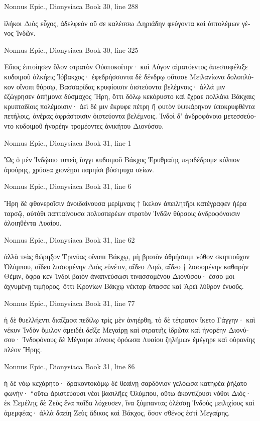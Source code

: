 \documentclass[12pt,letterpaper,twoside,final]{memoir}
\begin{document}
\begin{greek}
Nonnus Epic., Dionysiaca 
Book 30, line 288

ἱλήκοι Διὸς εὖχος, ἀδελφεὸν οὔ σε καλέσσω 
Δηριάδην φεύγοντα καὶ ἀπτολέμων γένος Ἰνδῶν. 



Nonnus Epic., Dionysiaca 
Book 30, line 325

Εὔιος ἐπτοίησεν ὅλον στρατὸν Οὐατοκοίτην· 
καὶ Λύγον αἱματόεντος ἀπεστυφέλιξε κυδοιμοῦ 
ἀλκήεις Ἰόβακχος· ἐφεδρήσσοντα δὲ δένδρῳ 
οὔτασε Μειλανίωνα δολοπλόκον οἴνοπι θύρσῳ, 
Βασσαρίδας κρυφίοισιν ὀιστεύοντα βελέμνοις· 
ἀλλά μιν ἐζώγρησεν ἀπήμονα δύσμαχος Ἥρη, 
ὅττι δόλῳ κεκόρυστο καὶ ἔχραε πολλάκι Βάκχαις 
κρυπταδίοις πολέμοισιν· ἀεὶ δέ μιν ἔκρυφε πέτρη 
ἢ φυτὸν ὑψικάρηνον ὑποκρυφθέντα πετήλοις, 
ἀνέρας ἀφράστοισιν ὀιστεύοντα βελέμνοις. 
 Ἰνδοὶ δ' ἀνδροφόνοιο μετεσσεύοντο κυδοιμοῦ 
ἠνορέην τρομέοντες ἀνικήτου Διονύσου. 



Nonnus Epic., Dionysiaca 
Book 31, line 1

Ὣς ὁ μὲν Ἰνδῴοιο τυπεὶς ἴυγγι κυδοιμοῦ 
Βάκχος Ἐρυθραίης περιδέδρομε κόλπον ἀρούρης, 
χρύσεα χιονέῃσι παρηίσι βόστρυχα σείων. 



Nonnus Epic., Dionysiaca 
Book 31, line 6

Ἥρη δὲ φθονεροῖσιν ἀνοιδαίνουσα μερίμναις 
† ἴκελον ἀπειλητῆρι κατέγραφεν ἠέρα ταρσῷ, 
αὐτόθι παπταίνουσα πολυσπερέων στρατὸν Ἰνδῶν 
θύρσοις ἀνδροφόνοισιν ἀλοιηθέντα Λυαίου. 



Nonnus Epic., Dionysiaca 
Book 31, line 62

ἀλλὰ τεὰς θώρηξον Ἐρινύας οἴνοπι Βάκχῳ, 
μὴ βροτὸν ἀθρήσαιμι νόθον σκηπτοῦχον Ὀλύμπου, 
αἴδεο λισσομένην Διὸς εὐνέτιν, αἴδεο Δηώ, 
αἴδεο † λισσομένην καθαρὴν Θέμιν, ὄφρα κεν Ἰνδοὶ 
βαιὸν ἀναπνεύσωσι τινασσομένου Διονύσου· 
ἔσσο μοι ἀχνυμένῃ τιμήορος, ὅττι Κρονίων   
Βάκχῳ νέκταρ ὄπασσε καὶ Ἄρεϊ λύθρον ἐνυοῦς. 



Nonnus Epic., Dionysiaca 
Book 31, line 77

ἡ δὲ θυελλήεντι διαΐξασα πεδίλῳ 
τρὶς μὲν ἀνηέρθη, τὸ δὲ τέτρατον ἵκετο Γάγγην· 
καὶ νέκυν Ἰνδὸν ὅμιλον ἀμειδέι δεῖξε Μεγαίρῃ 
καὶ στρατιῆς ἱδρῶτα καὶ ἠνορέην Διονύσου· 
Ἰνδοφόνους δὲ Μέγαιρα πόνους ὁρόωσα Λυαίου 
ζηλήμων ἐμέγηρε καὶ οὐρανίης πλέον Ἥρης. 



Nonnus Epic., Dionysiaca 
Book 31, line 86

ἡ δὲ νόῳ κεχάρητο· δρακοντοκόμῳ δὲ θεαίνῃ 
σαρδόνιον γελόωσα κατηφέα ῥήξατο φωνήν· 
 “οὕτω ἀριστεύουσι νέοι βασιλῆες Ὀλύμπου, 
οὕτω ἀκοντίζουσι νόθοι Διός· ἐκ Σεμέλης δὲ 
Ζεὺς ἕνα παῖδα λόχευσεν, ἵνα ξύμπαντας ὀλέσσῃ 
Ἰνδοὺς μειλιχίους καὶ ἀμεμφέας· ἀλλὰ δαείη   
Ζεὺς ἄδικος καὶ Βάκχος, ὅσον σθένος ἐστὶ Μεγαίρης. 




\end{greek}
\end{document}
